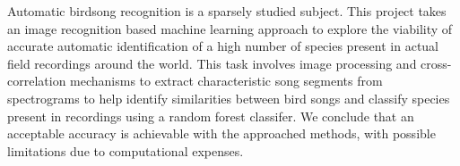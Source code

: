 Automatic birdsong recognition is a sparsely studied subject.
This project takes an image recognition based machine learning approach 
to explore the viability of accurate automatic identification of a high number of
species present in actual field recordings around the world.
This task involves image processing and cross-correlation mechanisms to extract
characteristic song segments from spectrograms to help identify similarities 
between bird songs and classify species present in recordings using a random
forest classifer.
We conclude that an acceptable accuracy is achievable with the approached methods,
with possible limitations due to computational expenses.
